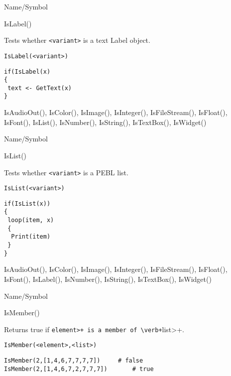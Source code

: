\begin{desc}{Name/Symbol}
\item[Name/Symbol]	IsLabel()

\item[Description]	Tests whether \verb+<variant>+ is a text Label object.

\item[Usage]		
\begin{verbatim}
IsLabel(<variant>)
\end{verbatim}

\item[Example]	
\begin{verbatim}
if(IsLabel(x)
{
 text <- GetText(x)
}
\end{verbatim}

\item[See Also]	IsAudioOut(), IsColor(), IsImage(), IsInteger(), 
		IsFileStream(), IsFloat(), IsFont(), IsList(), 
		IsNumber(), IsString(), IsTextBox(), IsWidget()
\end{desc}

\rl


\begin{desc}{Name/Symbol}
\item[Name/Symbol]	IsList()

\item[Description]	Tests whether \verb+<variant>+ is a PEBL list.

\item[Usage]
\begin{verbatim}
IsList(<variant>)
\end{verbatim}

\item[Example]	
\begin{verbatim}
if(IsList(x))
{
 loop(item, x)
 {
  Print(item)
 }
}
\end{verbatim}

\item[See Also]	IsAudioOut(), IsColor(), IsImage(), IsInteger(), 
		IsFileStream(), IsFloat(), IsFont(), IsLabel(),
		IsNumber(), IsString(), IsTextBox(), IsWidget()
\end{desc}

\rl


\begin{desc}{Name/Symbol}
\item[Name/Symbol]	IsMember()

\item[Description]	Returns true if \verb<element>+ is a member of \verb+<list>+.

\item[Usage]		
\begin{verbatim}
IsMember(<element>,<list>)
\end{verbatim}

\item[Example]	
\begin{verbatim}
IsMember(2,[1,4,6,7,7,7,7])		# false
IsMember(2,[1,4,6,7,2,7,7,7]) 		# true
\end{verbatim}

\item[See Also]	
\end{desc}

